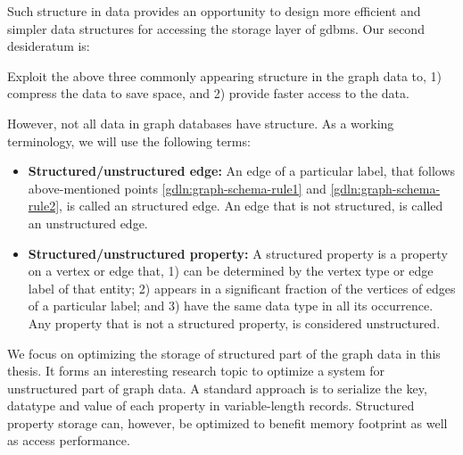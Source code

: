 \begin{guideline}
\begin{enumerate}
	\end{enumerate}
	
	Such structure in data provides an opportunity to design more efficient and simpler data structures for accessing the storage layer of \gls{gdbms}. Our second desideratum is:
	
	\begin{desideratum}
		Exploit the above three commonly appearing structure in the graph data to, 1) compress the data to save space, and 2) provide faster access to the data.
	\end{desideratum}
	
	However, not all data in graph databases have structure. As a working terminology, we will use the following terms:
	
	
	\begin{itemize}
		\item \textbf{Structured/unstructured edge:} An edge of a particular label, that follows above-mentioned points \ref{gdln:graph-schema-rule1} and \ref{gdln:graph-schema-rule2}, is called an structured edge. An edge that is not structured, is called an unstructured edge.
		
		\item \textbf{Structured/unstructured property:} A structured property is a property on a vertex or edge that, 1) can be determined by the vertex type or edge label of that entity; 2) appears in a significant fraction of the vertices of edges of a particular label; and 3) have the same data type in all its occurrence. Any property that is not a structured property, is considered unstructured.
		
	\end{itemize}
	
	
	We focus on optimizing the storage of structured part of the graph data in this thesis. It forms an interesting research topic to optimize a system for unstructured part of graph data. A standard approach is to serialize the key, datatype and value of each property in variable-length records. Structured property storage can, however, be optimized to benefit memory footprint as well as access performance.
	
\end{guideline}

